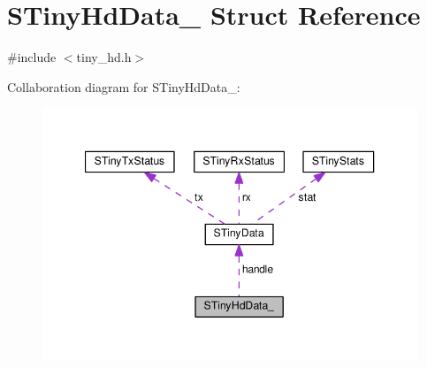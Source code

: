 \hypertarget{structSTinyHdData__}{}\section{S\+Tiny\+Hd\+Data\+\_\+ Struct Reference}
\label{structSTinyHdData__}


{\ttfamily \#include $<$tiny\+\_\+hd.\+h$>$}



Collaboration diagram for S\+Tiny\+Hd\+Data\+\_\+\+:\nopagebreak
\begin{figure}[H]
\begin{center}
\leavevmode
\includegraphics[width=347pt]{structSTinyHdData____coll__graph}
\end{center}
\end{figure}
